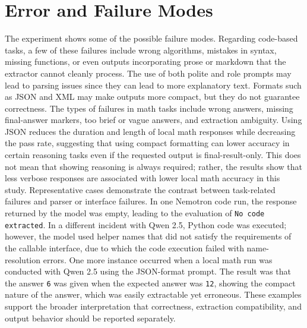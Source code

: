\section{Error and Failure Modes\label{sec:failure-modes}}

The experiment shows some of the possible failure modes. Regarding code-based tasks, a few of these failures include wrong algorithms, mistakes in syntax, missing functions, or even outputs incorporating prose or markdown that the extractor cannot cleanly process. The use of both polite and role prompts may lead to parsing issues since they can lead to more explanatory text. Formats such as JSON and XML may make outputs more compact, but they do not guarantee correctness.
The types of failures in math tasks include wrong answers, missing final-answer markers, too brief or vague answers, and extraction ambiguity. Using JSON reduces the duration and length of local math responses while decreasing the pass rate, suggesting that using compact formatting can lower accuracy in certain reasoning tasks even if the requested output is final-result-only. This does not mean that showing reasoning is always required; rather, the results show that less verbose responses are associated with lower local math accuracy in this study.
Representative cases demonstrate the contrast between task-related failures and parser or interface failures. In one Nemotron code run, the response returned by the model was empty, leading to the evaluation of \texttt{No code extracted}. In a different incident with Qwen 2.5, Python code was executed; however, the model used helper names that did not satisfy the requirements of the callable interface, due to which the code execution failed with name-resolution errors. One more instance occurred when a local math run was conducted with Qwen 2.5 using the JSON-format prompt. The result was that the answer \texttt{6} was given when the expected answer was \texttt{12}, showing the compact nature of the answer, which was easily extractable yet erroneous. These examples support the broader interpretation that correctness, extraction compatibility, and output behavior should be reported separately.
